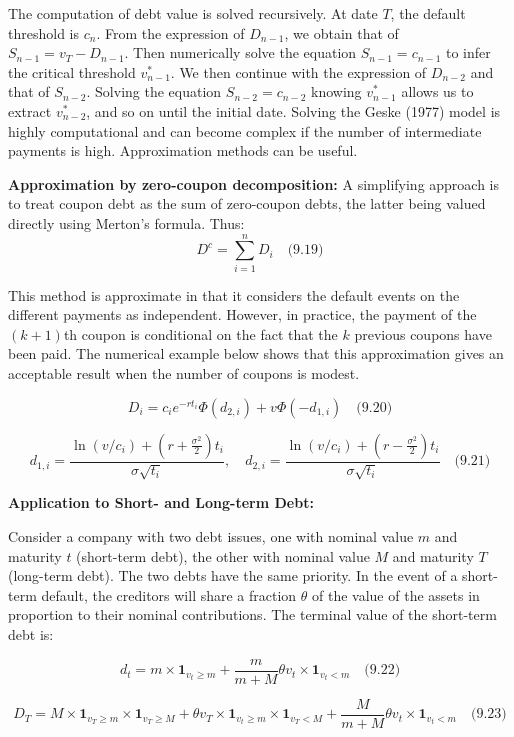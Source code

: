 \documentclass[12pt,a4paper]{article}
\begin{document}
The computation of debt value is solved recursively. At date $T$, the default threshold is $c_n$. From the expression of $D_{n-1}$, we obtain that of $S_{n-1} = v_T - D_{n-1}$. Then numerically solve the equation $S_{n-1} = c_{n-1}$ to infer the critical threshold $v_{n-1}^*$. We then continue with the expression of $D_{n-2}$ and that of $S_{n-2}$. Solving the equation $S_{n-2} = c_{n-2}$ knowing $v_{n-1}^*$ allows us to extract $v_{n-2}^*$, and so on until the initial date. Solving the Geske (1977) model is highly computational and can become complex if the number of intermediate payments is high. Approximation methods can be useful.

\textbf{Approximation by zero-coupon decomposition:} A simplifying approach is to treat coupon debt as the sum of zero-coupon debts, the latter being valued directly using Merton's formula. Thus:
$$D^c = \sum_{i=1}^{n} D_i \quad \text{(9.19)}$$

This method is approximate in that it considers the default events on the different payments as independent. However, in practice, the payment of the $(k + 1)$th coupon is conditional on the fact that the $k$ previous coupons have been paid. The numerical example below shows that this approximation gives an acceptable result when the number of coupons is modest.

$$D_i = c_i e^{-rt_i}\Phi(d_{2,i}) + v\Phi(-d_{1,i}) \quad \text{(9.20)}$$

$$d_{1,i} = \frac{\ln(v/c_i) + (r + \frac{\sigma^2}{2})t_i}{\sigma\sqrt{t_i}}, \quad d_{2,i} = \frac{\ln(v/c_i) + (r - \frac{\sigma^2}{2})t_i}{\sigma\sqrt{t_i}} \quad \text{(9.21)}$$

\textbf{Application to Short- and Long-term Debt:}

Consider a company with two debt issues, one with nominal value $m$ and maturity $t$ (short-term debt), the other with nominal value $M$ and maturity $T$ (long-term debt). The two debts have the same priority. In the event of a short-term default, the creditors will share a fraction $\theta$ of the value of the assets in proportion to their nominal contributions. The terminal value of the short-term debt is:

$$d_t = m \times \mathbf{1}_{v_t \geq m} + \frac{m}{m+M} \theta v_t \times \mathbf{1}_{v_t < m} \quad \text{(9.22)}$$

$$D_T = M \times \mathbf{1}_{v_T \geq m} \times \mathbf{1}_{v_T \geq M} + \theta v_T \times \mathbf{1}_{v_t \geq m} \times \mathbf{1}_{v_T < M} + \frac{M}{m+M} \theta v_t \times \mathbf{1}_{v_t < m} \quad \text{(9.23)}$$
\end{document}
